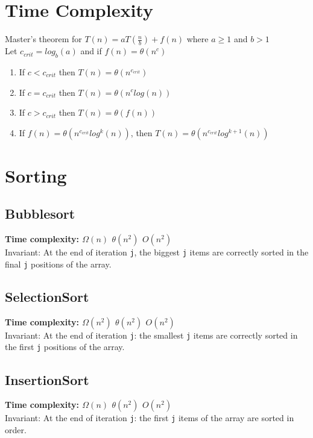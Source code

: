 \documentclass[10pt,landscape,a4paper]{article}
\begin{document}
\footnotesize
\begin{multicols*}{4}
\section{Time Complexity}
{Master's theorem for $T(n) = aT(\frac{n}{b}) + f(n)$ where $a \geq 1$ and $b > 1$} \\
Let $c_{crit} = log_b(a)$ and if $f(n) = \theta(n^c)$
\begin{enumerate}
    \item {If $c < c_{crit}$ then $T(n) = \theta(n^{c_{crit}})$} 
    \item {If $c = c_{crit}$ then $T(n) = \theta(n^clog(n))$} 
    \item {If $c > c_{crit}$ then $T(n) = \theta(f(n))$} 
    \item {If $f(n) = \theta(n^{c_{crit}}log^k(n))$, then $T(n) = \theta(n^{c_{crit}}log^{k+1}(n))$} 

\end{enumerate}

\section{Sorting}
\subsection{Bubblesort}
\textbf{Time complexity: $\Omega({n})$ $\theta(n^2)$ $O(n^2)$} \\
Invariant: At the end of iteration \texttt{j}, the biggest \texttt{j} items are correctly sorted in the final \texttt{j} positions of the array.

\subsection{SelectionSort}
\textbf{Time complexity: $\Omega({n^2})$ $\theta(n^2)$ $O(n^2)$} \\
Invariant: At the end of iteration \texttt{j}: the smallest \texttt{j} items are correctly sorted in the first \texttt{j} positions of the array.

\subsection{InsertionSort}
\textbf{Time complexity: $\Omega({n})$ $\theta(n^2)$ $O(n^2)$} \\
Invariant: At the end of iteration \texttt{j}: the first \texttt{j} items of the array are sorted in order.


\end{multicols*}
\end{document}
